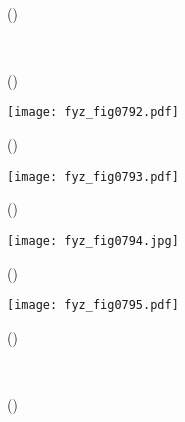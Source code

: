     \begin{figure}[ht!]
      \centering
                     \\
      \label{fyz:fig0790}
      \caption{
               (\cite[s.~748]{Feynman02})}
    \end{figure}

    \begin{figure}[ht!]
      \centering
                     \\
      \label{fyz:fig0791}
      \caption{
               (\cite[s.~748]{Feynman02})}
    \end{figure}

    \begin{figure}[ht!] %
      \centering
      \texttt{[image: fyz\_fig0792.pdf]}
      \caption{
               (\cite[s.~707]{Feynman02})}
      \label{fyz:fig0792}
    \end{figure}

    \begin{figure}[ht!] %
      \centering
      \texttt{[image: fyz\_fig0793.pdf]}
      \caption{
               (\cite[s.~707]{Feynman02})}
      \label{fyz:fig0793}
    \end{figure}

    \begin{figure}[ht!] %
      \centering
      \texttt{[image: fyz\_fig0794.jpg]}
      \caption{
               (\cite[s.~707]{Feynman02})}
      \label{fyz:fig0794}
    \end{figure}

    \begin{figure}[ht!] %
      \centering
      \texttt{[image: fyz\_fig0795.pdf]}
      \caption{
               (\cite[s.~707]{Feynman02})}
      \label{fyz:fig0795}
    \end{figure}

    \begin{figure}[ht!]
      \centering
                     \\
      \label{fyz:fig0796}
      \caption{
               (\cite[s.~748]{Feynman02})}
    \end{figure}

